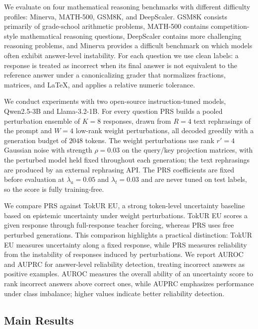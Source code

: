 \documentclass{article} %
\begin{document}
We evaluate on four mathematical reasoning benchmarks with different difficulty
profiles: Minerva, MATH-500, GSM8K, and DeepScaler. GSM8K consists primarily of
grade-school arithmetic problems, MATH-500 contains competition-style
mathematical reasoning questions, DeepScaler contains more challenging reasoning
problems, and Minerva provides a difficult benchmark on which models often
exhibit answer-level instability. For each question we use clean labels: a
response is treated as incorrect when its final answer is not equivalent to the
reference answer under a canonicalizing grader that normalizes fractions,
matrices, and LaTeX, and applies a relative numeric tolerance.

We conduct experiments with two open-source instruction-tuned models,
Qwen2.5-3B and Llama-3.2-1B. For every question PRS builds a pooled perturbation
ensemble of $K=8$ responses, drawn from $R=4$ text rephrasings of the prompt and
$W=4$ low-rank weight perturbations, all decoded greedily with a generation
budget of $2048$ tokens. The weight perturbations use rank $r'=4$ Gaussian noise
with strength $\rho=0.03$ on the query/key projection matrices, with the
perturbed model held fixed throughout each generation; the text rephrasings are
produced by an external rephrasing API. The PRS coefficients are fixed before
evaluation at $\lambda_a=0.05$ and $\lambda_t=0.03$ and are never tuned on test
labels, so the score is fully training-free.

We compare PRS against TokUR EU, a strong token-level uncertainty baseline based
on epistemic uncertainty under weight perturbations. TokUR EU scores a given
response through full-response teacher forcing, whereas PRS uses free perturbed
generations. This comparison highlights a practical distinction: TokUR EU
measures uncertainty along a fixed response, while PRS measures reliability from
the instability of responses induced by perturbations. We report AUROC and AUPRC
for answer-level reliability detection, treating incorrect answers as positive
examples. AUROC measures the overall ability of an uncertainty score to rank
incorrect answers above correct ones, while AUPRC emphasizes performance under
class imbalance; higher values indicate better reliability detection.

\subsection{Main Results}
\label{sec:main-results}
\end{document}
